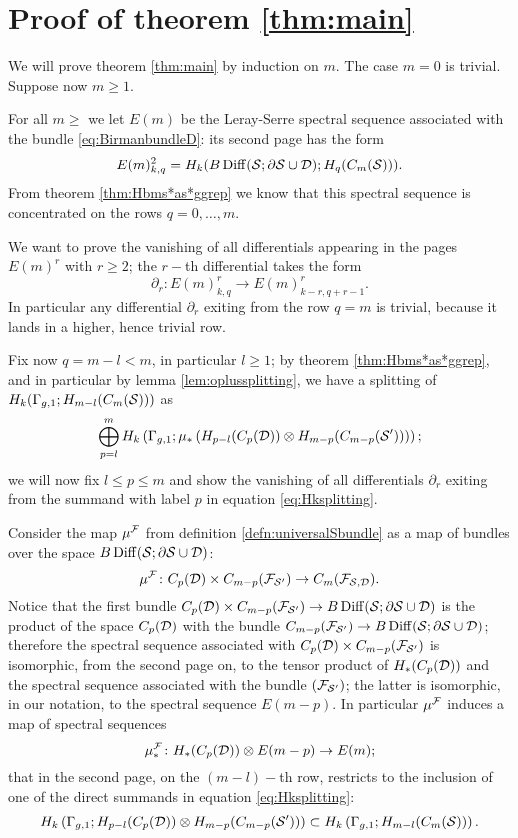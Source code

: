 \section{Proof of theorem \ref{thm:main}}
We will prove theorem \ref{thm:main} by induction on $m$.
The case $m=0$ is trivial. Suppose now $m\geq 1$.

For all $m\geq$ we let $E(m)$ be the Leray-Serre spectral sequence associated with
the bundle \ref{eq:BirmanbundleD}: its second page has the form
\[
 E(m)^2_{k,q}=H_k(B\operatorname{Diff}(\mathcal{S};\partial\mathcal{S}\cup\mathcal{D});H_q(C_m(\mathcal{S}))).
\]
From theorem \ref{thm:Hbms*as*ggrep} we know that this spectral sequence is concentrated
on the rows $q=0,\dots, m$.

We want to prove the vanishing of all differentials appearing in the pages
$E(m)^r$ with $r\geq 2$; the $r-$th differential takes the form
\[
 \partial_r\colon E(m)^r_{k,q}\to E(m)^r_{k-r,q+r-1}.
\]
In particular any differential $\partial_r$ exiting from the row $q=m$ is trivial,
because it lands in a higher, hence trivial row.

Fix now $q=m-l<m$, in particular $l\geq 1$; by theorem \ref{thm:Hbms*as*ggrep}, and
in particular by lemma \ref{lem:oplussplitting}, we have a splitting of $H_k(\Gamma_{g,1};H_{m-l}(C_m(\mathcal{S})))$ as
\begin{equation}
\label{eq:Hksplitting}
 \bigoplus_{p=l}^m H_k\left(\Gamma_{g,1};\mu_*\left(H_{p-l}(C_p(\mathcal{D}))\otimes H_{m-p}(C_{m-p}(\mathcal{S}'))\right)\right);
\end{equation} 
we will now fix $l\leq p\leq m$ and show the vanishing of all differentials $\partial_r$ exiting from the
summand with label $p$ in equation \ref{eq:Hksplitting}.

Consider the map $\mu^{\mathcal{F}}$ from definition \ref{defn:universalSbundle} as a map of
bundles over the space $B\operatorname{Diff}(\mathcal{S};\partial\mathcal{S}\cup\mathcal{D})$:
\[
 \mu^{\mathcal{F}}\colon C_p(\mathcal{D})\times C_{m-p}(\mathcal{F}_{\mathcal{S}'})\to C_m(\mathcal{F}_{\mathcal{S},\mathcal{D}}).
\]
Notice that the first bundle $C_p(\mathcal{D})\times C_{m-p}(\mathcal{F}_{\mathcal{S}'})\to B\operatorname{Diff}(\mathcal{S};\partial\mathcal{S}\cup\mathcal{D})$
is the product of the space $C_p(\mathcal{D})$ with the bundle $C_{m-p}(\mathcal{F}_{\mathcal{S}'})\to B\operatorname{Diff}(\mathcal{S};\partial\mathcal{S}\cup\mathcal{D})$;
therefore the spectral sequence associated with $C_p(\mathcal{D})\times C_{m-p}(\mathcal{F}_{\mathcal{S}'})$ is isomorphic,
from the second page on, to the tensor product
of $H_*(C_p(\mathcal{D}))$ and the spectral sequence associated with the bundle $(\mathcal{F}_{\mathcal{S}'})$; the
latter is isomorphic, in our notation, to the spectral sequence $E(m-p)$.
In particular $\mu^{\mathcal{F}}$ induces a map of spectral
sequences
\[
\mu^{\mathcal{F}}_*\colon H_*(C_p(\mathcal{D}))\otimes E(m-p)\to E(m);
\]
that in the second page, on the $(m-l)-$th row, restricts to
the inclusion of one of the direct summands in equation \ref{eq:Hksplitting}:
\[
H_k\left(\Gamma_{g,1};H_{p-l}(C_p(\mathcal{D}))\otimes H_{m-p}(C_{m-p}(\mathcal{S}'))\right)\subset H_k\left(\Gamma_{g,1};H_{m-l}(C_m(\mathcal{S}))\right).
\]

